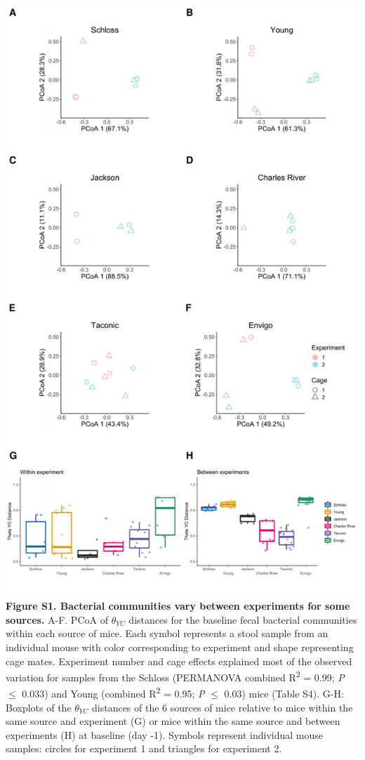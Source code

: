 \documentclass[
  11pt,
]{article}
\begin{document}
\includegraphics{figure_S1.pdf} \textbf{Figure S1. Bacterial communities
vary between experiments for some sources.} A-F. PCoA of \(\theta_{YC}\)
distances for the baseline fecal bacterial communities within each
source of mice. Each symbol represents a stool sample from an individual
mouse with color corresponding to experiment and shape representing cage
mates. Experiment number and cage effects explained most of the observed
variation for samples from the Schloss (PERMANOVA combined
R\textsuperscript{2} = 0.99; \emph{P} \(\le\) 0.033) and Young (combined
R\textsuperscript{2} = 0.95; \emph{P} \(\le\) 0.03) mice (Table S4).
G-H: Boxplots of the \(\theta_{YC}\) distances of the 6 sources of mice
relative to mice within the same source and experiment (G) or mice
within the same source and between experiments (H) at baseline (day -1).
Symbols represent individual mouse samples: circles for experiment 1 and
triangles for experiment 2.
\end{document}
